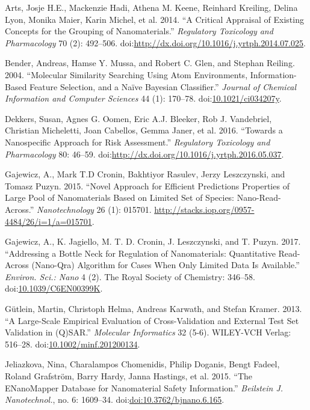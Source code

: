 \documentclass[utf8]{frontiersHLTH} %
\begin{document}
\hypertarget{ref-Arts14}{}
Arts, Josje H.E., Mackenzie Hadi, Athena M. Keene, Reinhard Kreiling,
Delina Lyon, Monika Maier, Karin Michel, et al. 2014. ``A Critical
Appraisal of Existing Concepts for the Grouping of Nanomaterials.''
\emph{Regulatory Toxicology and Pharmacology} 70 (2): 492--506.
doi:\href{https://doi.org/http://dx.doi.org/10.1016/j.yrtph.2014.07.025}{http://dx.doi.org/10.1016/j.yrtph.2014.07.025}.

\hypertarget{ref-Bender04}{}
Bender, Andreas, Hamse Y. Mussa, and Robert C. Glen, and Stephan
Reiling. 2004. ``Molecular Similarity Searching Using Atom Environments,
Information-Based Feature Selection, and a Naïve Bayesian Classifier.''
\emph{Journal of Chemical Information and Computer Sciences} 44 (1):
170--78.
doi:\href{https://doi.org/10.1021/ci034207y}{10.1021/ci034207y}.

\hypertarget{ref-Dekkers16}{}
Dekkers, Susan, Agnes G. Oomen, Eric A.J. Bleeker, Rob J. Vandebriel,
Christian Micheletti, Joan Cabellos, Gemma Janer, et al. 2016. ``Towards
a Nanospecific Approach for Risk Assessment.'' \emph{Regulatory
Toxicology and Pharmacology} 80: 46--59.
doi:\href{https://doi.org/http://dx.doi.org/10.1016/j.yrtph.2016.05.037}{http://dx.doi.org/10.1016/j.yrtph.2016.05.037}.

\hypertarget{ref-Gajewicz14}{}
Gajewicz, A., Mark T.D Cronin, Bakhtiyor Rasulev, Jerzy Leszczynski, and
Tomasz Puzyn. 2015. ``Novel Approach for Efficient Predictions
Properties of Large Pool of Nanomaterials Based on Limited Set of
Species: Nano-Read-Across.'' \emph{Nanotechnology} 26 (1): 015701.
\url{http://stacks.iop.org/0957-4484/26/i=1/a=015701}.

\hypertarget{ref-Gajewicz17}{}
Gajewicz, A., K. Jagiello, M. T. D. Cronin, J. Leszczynski, and T.
Puzyn. 2017. ``Addressing a Bottle Neck for Regulation of Nanomaterials:
Quantitative Read-Across (Nano-Qra) Algorithm for Cases When Only
Limited Data Is Available.'' \emph{Environ. Sci.: Nano} 4 (2). The Royal
Society of Chemistry: 346--58.
doi:\href{https://doi.org/10.1039/C6EN00399K}{10.1039/C6EN00399K}.

\hypertarget{ref-Guxfctlein2013}{}
Gütlein, Martin, Christoph Helma, Andreas Karwath, and Stefan Kramer.
2013. ``A Large-Scale Empirical Evaluation of Cross-Validation and
External Test Set Validation in (Q)SAR.'' \emph{Molecular Informatics}
32 (5-6). WILEY-VCH Verlag: 516--28.
doi:\href{https://doi.org/10.1002/minf.201200134}{10.1002/minf.201200134}.

\hypertarget{ref-Jeliazkova15}{}
Jeliazkova, Nina, Charalampos Chomenidis, Philip Doganis, Bengt Fadeel,
Roland Grafström, Barry Hardy, Janna Hastings, et al. 2015. ``The
ENanoMapper Database for Nanomaterial Safety Information.''
\emph{Beilstein J. Nanotechnol.}, no. 6: 1609--34.
doi:\href{https://doi.org/doi:10.3762/bjnano.6.165}{doi:10.3762/bjnano.6.165}.
\end{document}
